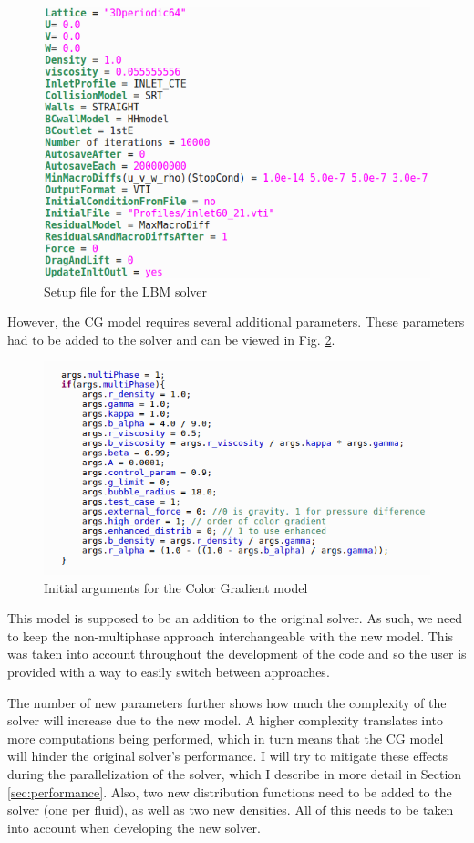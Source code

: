\documentclass[12pt, openany]{book}
\begin{document}
\begin{figure}[H]
	\centering
	\includegraphics[width=0.9\linewidth]{Resources/Images/setup.png}
	\caption{Setup file for the LBM solver}
	\label{fig:setupLBM}
\end{figure}
 However, the CG model requires several additional parameters. These parameters had to be added to the solver and can be viewed in Fig. \ref{fig:setupCG}.
\begin{figure}[H]
	\centering
	\includegraphics[width=0.9\linewidth]{Resources/Images/setupCG.png}
	\caption{Initial arguments for the Color Gradient model}
	\label{fig:setupCG}
\end{figure}

This model is supposed to be an addition to the original solver. As such, we need to keep the non-multiphase approach interchangeable with the new model. This was taken into account throughout the development of the code and so the user is provided with a way to easily switch between approaches. \par
The number of new parameters further shows how much the complexity of the solver will increase due to the new model. A higher complexity translates into more computations being performed, which in turn means that the CG model will hinder the original solver's performance. I will try to mitigate these effects during the parallelization of the solver, which I describe in more detail in Section \ref{sec:performance}. Also, two new distribution functions need to be added to the solver (one per fluid), as well as two new densities. All of this needs to be taken into account when developing the new solver.
\end{document}
